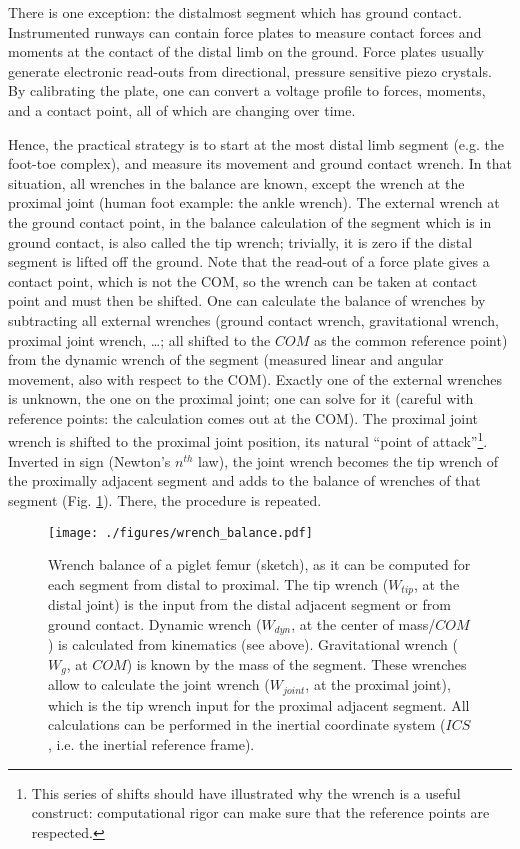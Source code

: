 \documentclass[10pt,a4paper]{article}
\begin{document}
There is one exception: the distalmost segment which has ground contact.
Instrumented runways can contain force plates to measure contact forces and moments at the contact of the distal limb on the ground.
Force plates usually generate electronic read-outs from directional, pressure sensitive piezo crystals.
By calibrating the plate, one can convert a voltage profile to forces, moments, and a contact point, all of which are changing over time.


Hence, the practical strategy \citep{Robertson2013,Lynch2017,Dumas2004} is to start at the most distal limb segment (e.g. the foot-toe complex), and measure its movement and ground contact wrench.
In that situation, all wrenches in the balance are known, except the wrench at the proximal joint (human foot example: the ankle wrench).
The external wrench at the ground contact point, in the balance calculation of the segment which is in ground contact, is also called the tip wrench; trivially, it is zero if the distal segment is lifted off the ground.
Note that the read-out of a force plate gives a contact point, which is not the COM, so the wrench can be taken at contact point and must then be shifted.
One can calculate the balance of wrenches by subtracting all external wrenches (ground contact wrench, gravitational wrench, proximal joint wrench, \ldots{}; all shifted to the \(COM\) as the common reference point) from the dynamic wrench of the segment (measured linear and angular movement, also with respect to the COM).
Exactly one of the external wrenches is unknown, the one on the proximal joint; one can solve for it (careful with reference points: the calculation comes out at the COM).
The proximal joint wrench is shifted to the proximal joint position, its natural ``point of attack''\footnote{This series of shifts should have illustrated why the wrench is a useful construct: computational rigor can make sure that the reference points are respected.}.
Inverted in sign (Newton's \(n^{th}\) law), the joint wrench becomes the tip wrench of the proximally adjacent segment and adds to the balance of wrenches of that segment (Fig. \ref{fig:wrenchbalance}).
There, the procedure is repeated.

\begin{figure}[p]
\centering
\texttt{[image: ./figures/wrench\_balance.pdf]}
\caption{\label{fig:wrenchbalance}Wrench balance of a piglet femur (sketch), as it can be computed for each segment from distal to proximal. The tip wrench (\(W_{tip}\), at the distal joint) is the input from the distal adjacent segment or from ground contact. Dynamic wrench (\(W_{dyn}\), at the center of mass/\(COM\)) is calculated from kinematics (see above). Gravitational wrench (\(W_{g}\), at \(COM\)) is known by the mass of the segment. These wrenches allow to calculate the joint wrench (\(W_{joint}\), at the proximal joint), which is the tip wrench input for the proximal adjacent segment. All calculations can be performed in the inertial coordinate system (\(ICS\), i.e. the inertial reference frame).}
\end{figure}
\end{document}
